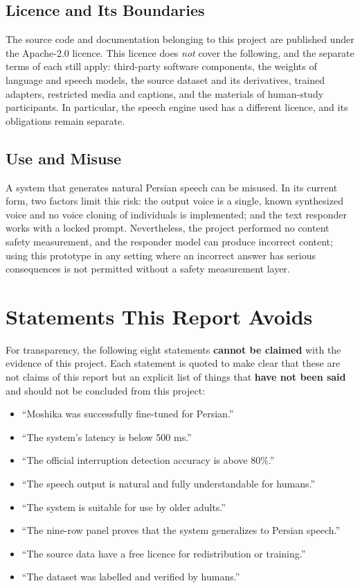 \subsection{Licence and Its Boundaries}

The source code and documentation belonging to this project are published under the Apache-2.0
licence. This licence does \emph{not} cover the following, and the separate terms of each still
apply: third-party software components, the weights of language and speech models, the source
dataset and its derivatives, trained adapters, restricted media and captions, and the materials of
human-study participants. In particular, the speech engine used has a different licence, and its
obligations remain separate.

\subsection{Use and Misuse}

A system that generates natural Persian speech can be misused. In its current form, two factors
limit this risk: the output voice is a single, known synthesized voice and no voice cloning of
individuals is implemented; and the text responder works with a locked prompt. Nevertheless, the
project performed no content safety measurement, and the responder model can produce incorrect
content; using this prototype in any setting where an incorrect answer has serious consequences is
not permitted without a safety measurement layer.

\section{Statements This Report Avoids}
\label{sec:forbidden}

For transparency, the following eight statements \textbf{cannot be claimed} with the evidence of
this project. Each statement is quoted to make clear that these are not claims of this report but
an explicit list of things that \textbf{have not been said} and should not be concluded from this
project:

\begin{itemize}
\item ``Moshika was successfully fine-tuned for Persian.''
\item ``The system's latency is below 500 ms.''
\item ``The official interruption detection accuracy is above 80\%.''
\item ``The speech output is natural and fully understandable for humans.''
\item ``The system is suitable for use by older adults.''
\item ``The nine-row panel proves that the system generalizes to Persian speech.''
\item ``The source data have a free licence for redistribution or training.''
\item ``The dataset was labelled and verified by humans.''
\end{itemize}
